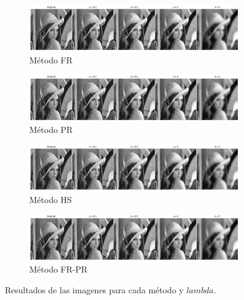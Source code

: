 \begin{figure}[H]
    \centering
    \begin{subfigure}{16cm}
        \includegraphics[width=1\textwidth]{Graphics/FR.png}
        \caption{Método FR}
    \end{subfigure}
    \begin{subfigure}{16cm}
        \includegraphics[width=1\textwidth]{Graphics/PR.png}
        \caption{Método PR}
    \end{subfigure}
    \begin{subfigure}{16cm}
        \includegraphics[width=1\textwidth]{Graphics/HS.png}
        \caption{Método HS}
    \end{subfigure}
    \begin{subfigure}{16cm}
        \includegraphics[width=1\textwidth]{Graphics/FR PR.png}
        \caption{Método FR-PR}
    \end{subfigure}
    \caption{Resultados de las imagenes para cada método y $lambda$.}
    \label{fig:images}
\end{figure}